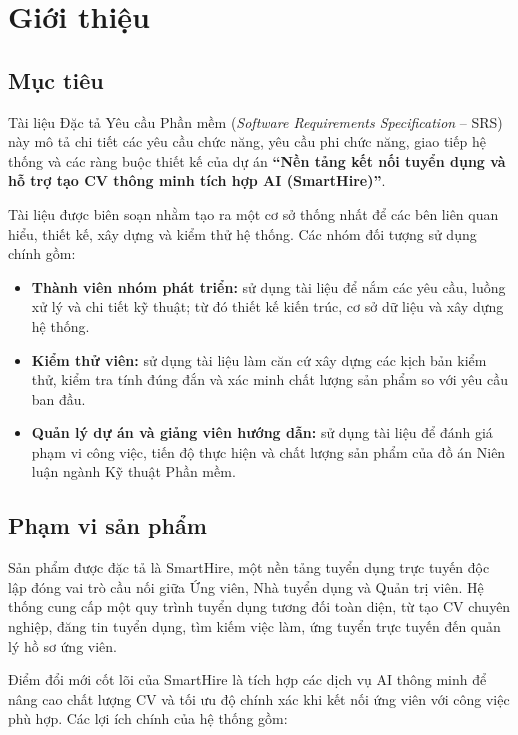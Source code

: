 
\newpage

\section{Giới thiệu}

\subsection{Mục tiêu}

Tài liệu Đặc tả Yêu cầu Phần mềm (\textit{Software Requirements Specification} -- SRS) này mô tả chi tiết các yêu cầu chức năng, yêu cầu phi chức năng, giao tiếp hệ thống và các ràng buộc thiết kế của dự án \textbf{``Nền tảng kết nối tuyển dụng và hỗ trợ tạo CV thông minh tích hợp AI (SmartHire)''}.

Tài liệu được biên soạn nhằm tạo ra một cơ sở thống nhất để các bên liên quan hiểu, thiết kế, xây dựng và kiểm thử hệ thống. Các nhóm đối tượng sử dụng chính gồm:

\begin{itemize}
    \item \textbf{Thành viên nhóm phát triển:} sử dụng tài liệu để nắm các yêu cầu, luồng xử lý và chi tiết kỹ thuật; từ đó thiết kế kiến trúc, cơ sở dữ liệu và xây dựng hệ thống.
    \item \textbf{Kiểm thử viên:} sử dụng tài liệu làm căn cứ xây dựng các kịch bản kiểm thử, kiểm tra tính đúng đắn và xác minh chất lượng sản phẩm so với yêu cầu ban đầu.
    \item \textbf{Quản lý dự án và giảng viên hướng dẫn:} sử dụng tài liệu để đánh giá phạm vi công việc, tiến độ thực hiện và chất lượng sản phẩm của đồ án Niên luận ngành Kỹ thuật Phần mềm.
\end{itemize}

\subsection{Phạm vi sản phẩm}

Sản phẩm được đặc tả là SmartHire, một nền tảng tuyển dụng trực tuyến độc lập đóng vai trò cầu nối giữa Ứng viên, Nhà tuyển dụng và Quản trị viên. Hệ thống cung cấp một quy trình tuyển dụng tương đối toàn diện, từ tạo CV chuyên nghiệp, đăng tin tuyển dụng, tìm kiếm việc làm, ứng tuyển trực tuyến đến quản lý hồ sơ ứng viên.

Điểm đổi mới cốt lõi của SmartHire là tích hợp các dịch vụ AI thông minh để nâng cao chất lượng CV và tối ưu độ chính xác khi kết nối ứng viên với công việc phù hợp. Các lợi ích chính của hệ thống gồm:

